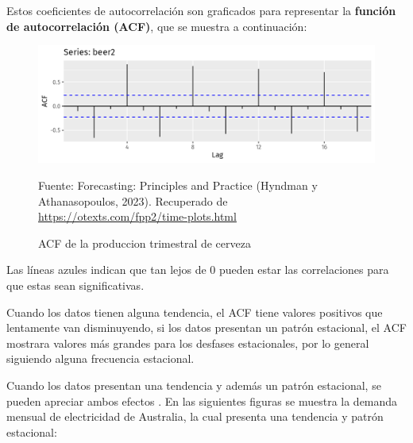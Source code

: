 \begin{itemize}
    Estos coeficientes de autocorrelación son graficados para representar la \textbf{función de autocorrelación (ACF)}, que se muestra a continuación:

    \begin{figure}[H]
        \begin{minipage}[t]{0.9\textwidth}
            \caption{ACF de la produccion trimestral de cerveza}
            \label{autocorrelaciones2}        
        \end{minipage}
    
        \vspace{10pt}
    
        \begin{minipage}[b]{1.1\textwidth}
            \centering
            \includegraphics[width=\textwidth]{img/produccion-cerveza-aust-ACF.png}        
        \end{minipage}
    
        \begin{minipage}[t]{0.9\textwidth}
            Fuente: Forecasting: Principles and Practice (Hyndman y Athanasopoulos, 2023). Recuperado de \url{https://otexts.com/fpp2/time-plots.html}
        \end{minipage}
    \end{figure}

    Las líneas azules indican que tan lejos de 0 pueden estar las correlaciones para que estas sean significativas. 
    
    Cuando los datos tienen alguna tendencia, el ACF tiene valores positivos que lentamente van disminuyendo, si los datos presentan un patrón estacional, el ACF mostrara valores más grandes para los desfases estacionales, por lo general siguiendo alguna frecuencia estacional.
    
    Cuando los datos presentan una tendencia y además un patrón estacional, se pueden apreciar ambos efectos \cite{forecast-time-series-arima}. En las siguientes figuras se muestra la demanda mensual de electricidad de Australia, la cual presenta una tendencia y patrón estacional:


\end{itemize}
